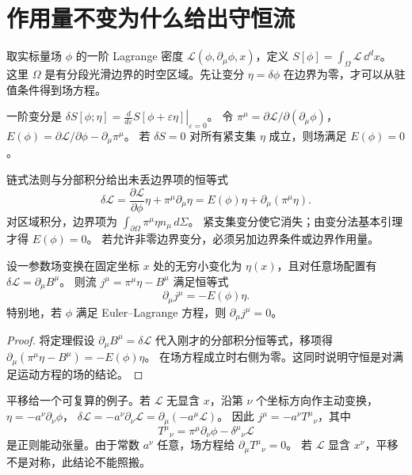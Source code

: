 \section{作用量不变为什么给出守恒流}

取实标量场 \(\phi\) 的一阶 Lagrange 密度
\(\mathcal L(\phi,\partial_\mu\phi,x)\)，定义
\(S[\phi]=\int_\Omega\mathcal L\,\dd^dx\)。
这里 \(\Omega\) 是有分段光滑边界的时空区域。先让变分
\(\eta=\delta\phi\) 在边界为零，才可以从驻值条件得到场方程。

\begin{definition}
一阶变分是
\(\delta S[\phi;\eta]
=\left.\frac{d}{d\varepsilon}S[\phi+\varepsilon\eta]\right|_{\varepsilon=0}\)。
令 \(\pi^\mu=\partial\mathcal L/\partial(\partial_\mu\phi)\)，
\(E(\phi)=\partial\mathcal L/\partial\phi-\partial_\mu\pi^\mu\)。
若 \(\delta S=0\) 对所有紧支集 \(\eta\) 成立，则场满足 \(E(\phi)=0\)。
\end{definition}

链式法则与分部积分给出未丢边界项的恒等式
\[
\delta\mathcal L
=\frac{\partial\mathcal L}{\partial\phi}\eta
+\pi^\mu\partial_\mu\eta
=E(\phi)\eta+\partial_\mu(\pi^\mu\eta).
\]
对区域积分，边界项为
\(\int_{\partial\Omega}\pi^\mu\eta n_\mu\,d\Sigma\)。
紧支集变分使它消失；由变分法基本引理才得 \(E(\phi)=0\)。
若允许非零边界变分，必须另加边界条件或边界作用量。

\begin{theorem}
设一参数场变换在固定坐标 \(x\) 处的无穷小变化为
\(\eta(x)\)，且对任意场配置有
\(\delta\mathcal L=\partial_\mu B^\mu\)。
则流 \(j^\mu=\pi^\mu\eta-B^\mu\) 满足恒等式
\[
\partial_\mu j^\mu=-E(\phi)\eta.
\]
特别地，若 \(\phi\) 满足 Euler--Lagrange 方程，则
\(\partial_\mu j^\mu=0\)。
\end{theorem}
\begin{proof}
将定理假设 \(\partial_\mu B^\mu=\delta\mathcal L\) 代入刚才的分部积分恒等式，移项得
\(\partial_\mu(\pi^\mu\eta-B^\mu)=-E(\phi)\eta\)。
在场方程成立时右侧为零。这同时说明守恒是对满足运动方程的场的结论。
\end{proof}

平移给一个可复算的例子。若 \(\mathcal L\) 无显含 \(x\)，沿第 \(\nu\) 个坐标方向作主动变换，
\(\eta=-a^\nu\partial_\nu\phi\)，
\(\delta\mathcal L=-a^\nu\partial_\nu\mathcal L
=\partial_\mu(-a^\mu\mathcal L)\)。
因此
\(j^\mu=-a^\nu T^\mu{}_\nu\)，其中
\[
T^\mu{}_\nu=\pi^\mu\partial_\nu\phi-\delta^\mu{}_\nu\mathcal L
\]
是正则能动张量。由于常数 \(a^\nu\) 任意，场方程给
\(\partial_\mu T^\mu{}_\nu=0\)。
若 \(\mathcal L\) 显含 \(x^\nu\)，平移不是对称，此结论不能照搬。

